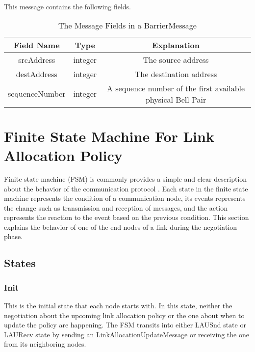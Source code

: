 This message contains the following fields.

\begin{table}[ht]
  \begin{center}
    \begin{tabular}{|c|c|c|} \hline
      Field Name & Type & Explanation \\ \hline \cline{1-3}
      srcAddress & integer & The source address \\ \cline{1-3}
      destAddress & integer & The destination address \\ \cline{1-3}
      sequenceNumber & integer & A sequence number of the first available physical Bell Pair \\ \cline{1-3}
    \end{tabular}
    \caption{The Message Fields in a BarrierMessage}
  \end{center}
\end{table}

\newpage

\section{Finite State Machine For Link Allocation Policy}

Finite state machine (FSM) is commonly provides a simple and clear description about the behavior of the communication protocol \cite{BOCHMANN1978361}.
Each state in the finite state machine represents the condition of a communication node, its events represents the change such as transmission and reception of messages, and the action represents the reaction to the event based on the previous condition.
This section explains the behavior of one of the end nodes of a link during the negotiation phase. 

\subsection{States}

\subsubsection{Init}
This is the initial state that each node starts with.  
In this state, neither the negotiation about the upcoming link allocation policy or the one about when to update the policy are happening.
The FSM transits into either LAUSnd state or LAURecv state by sending an LinkAllocationUpdateMessage or receiving the one from its neighboring nodes.

